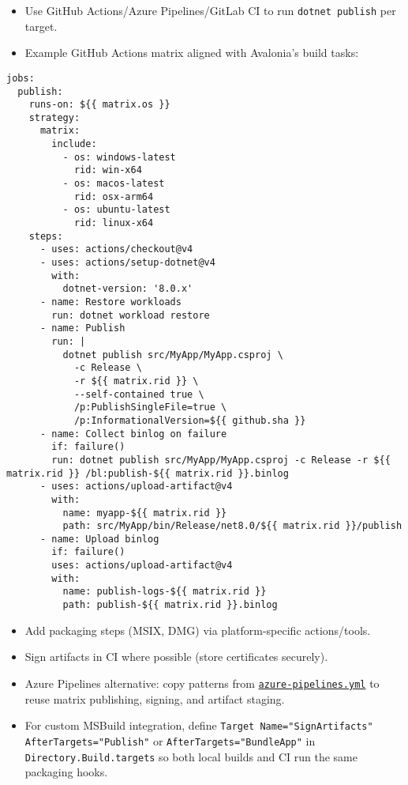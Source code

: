 \begin{itemize}
\tightlist
\item
  Use GitHub Actions/Azure Pipelines/GitLab CI to run
  \passthrough{\lstinline!dotnet publish!} per target.
\item
  Example GitHub Actions matrix aligned with Avalonia's build tasks:
\end{itemize}

\begin{lstlisting}
jobs:
  publish:
    runs-on: ${{ matrix.os }}
    strategy:
      matrix:
        include:
          - os: windows-latest
            rid: win-x64
          - os: macos-latest
            rid: osx-arm64
          - os: ubuntu-latest
            rid: linux-x64
    steps:
      - uses: actions/checkout@v4
      - uses: actions/setup-dotnet@v4
        with:
          dotnet-version: '8.0.x'
      - name: Restore workloads
        run: dotnet workload restore
      - name: Publish
        run: |
          dotnet publish src/MyApp/MyApp.csproj \
            -c Release \
            -r ${{ matrix.rid }} \
            --self-contained true \
            /p:PublishSingleFile=true \
            /p:InformationalVersion=${{ github.sha }}
      - name: Collect binlog on failure
        if: failure()
        run: dotnet publish src/MyApp/MyApp.csproj -c Release -r ${{ matrix.rid }} /bl:publish-${{ matrix.rid }}.binlog
      - uses: actions/upload-artifact@v4
        with:
          name: myapp-${{ matrix.rid }}
          path: src/MyApp/bin/Release/net8.0/${{ matrix.rid }}/publish
      - name: Upload binlog
        if: failure()
        uses: actions/upload-artifact@v4
        with:
          name: publish-logs-${{ matrix.rid }}
          path: publish-${{ matrix.rid }}.binlog
\end{lstlisting}

\begin{itemize}
\tightlist
\item
  Add packaging steps (MSIX, DMG) via platform-specific actions/tools.
\item
  Sign artifacts in CI where possible (store certificates securely).
\item
  Azure Pipelines alternative: copy patterns from
  \href{https://github.com/AvaloniaUI/Avalonia/blob/master/azure-pipelines.yml}{\passthrough{\lstinline!azure-pipelines.yml!}}
  to reuse matrix publishing, signing, and artifact staging.
\item
  For custom MSBuild integration, define
  \passthrough{\lstinline!Target Name="SignArtifacts" AfterTargets="Publish"!}
  or \passthrough{\lstinline!AfterTargets="BundleApp"!} in
  \passthrough{\lstinline!Directory.Build.targets!} so both local builds
  and CI run the same packaging hooks.
\end{itemize}

